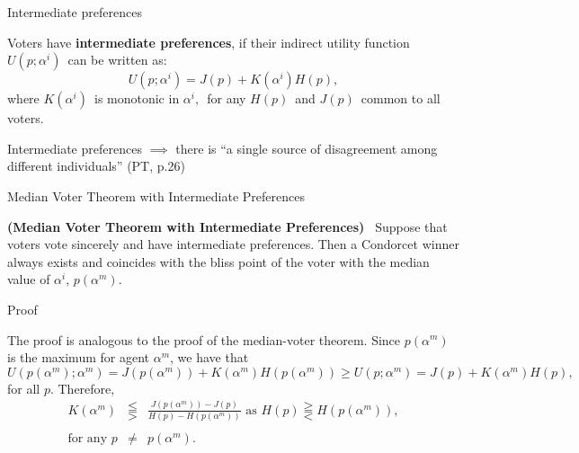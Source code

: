\documentclass[11pt,aspectratio=169]{beamer}
\begin{document}

\begin{frame}{Intermediate preferences}

\Large 

\begin{tcolorbox}
Voters have \textbf{intermediate preferences}, if their indirect utility
function $U(p;\alpha ^{i})$\ can be written as:
\begin{equation*}
U(p;\alpha ^{i})=J(p)+K(\alpha ^{i})H(p), 
\end{equation*}%
where $K(\alpha ^{i})$\ is monotonic in $\alpha ^{i},$\ for any $H(p)$\ and $%
J(p)$\ common to all voters.
\end{tcolorbox}

\pause

Intermediate preferences $\implies$ there is ``a single
source of disagreement among different individuals'' (PT, p.26)

\end{frame}
\begin{frame}{Median Voter Theorem with Intermediate Preferences}

\Large 

\begin{tcolorbox}
\textbf{(Median Voter Theorem with Intermediate Preferences)}\emph{\ }
Suppose that voters vote sincerely and have intermediate preferences. Then a
Condorcet winner always exists and coincides with the bliss point of the
voter with the median value of $\alpha ^{i}$, $p(\alpha ^{m}).$
\end{tcolorbox}
\end{frame}

\begin{frame}{Proof}

The proof is analogous to the proof of the median-voter theorem. Since $%
p(\alpha ^{m})$ is the maximum for agent $\alpha ^{m}$, we have that%
\begin{equation*}
U(p(\alpha ^{m});\alpha ^{m})=J(p(\alpha ^{m}))+K(\alpha ^{m})H(p(\alpha
^{m}))\geq U(p;\alpha ^{m})=J(p)+K(\alpha ^{m})H(p), 
\end{equation*}%
for all $p$. Therefore,%
\begin{eqnarray*}
K(\alpha ^{m}) &\lesseqqgtr &\frac{J(p(\alpha ^{m}))-J(p)}{H(p)-H(p(\alpha
^{m}))}\text{ as }H(p)\gtreqqless H(p(\alpha ^{m})), \\
\\
\text{for any }p &\neq &p(\alpha ^{m}).\text{ \ }
\end{eqnarray*}%
\end{frame}
\end{document}
